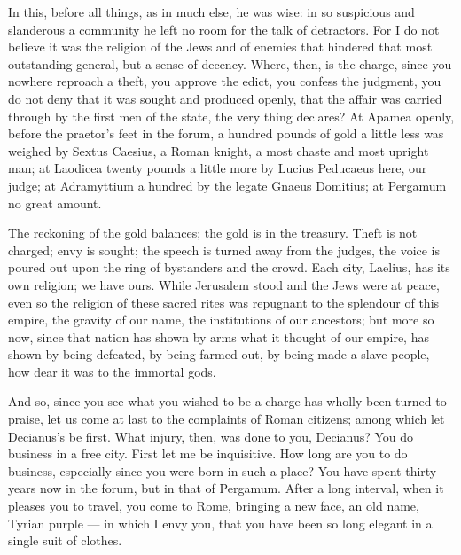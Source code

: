  In this, before all things, as in much else, he was wise: in so suspicious and slanderous a community he left no room for the talk of detractors. For I do not believe it was the religion of the Jews and of enemies that hindered that most outstanding general, but a sense of decency. Where, then, is the charge, since you nowhere reproach a theft, you approve the edict, you confess the judgment, you do not deny that it was sought and produced openly, that the affair was carried through by the first men of the state, the very thing declares? At Apamea openly, before the praetor's feet in the forum, a hundred pounds of gold a little less was weighed by Sextus Caesius, a Roman knight, a most chaste and most upright man; at Laodicea twenty pounds a little more by Lucius Peducaeus here, our judge; at Adramyttium a hundred by the legate Gnaeus Domitius; at Pergamum no great amount.

 The reckoning of the gold balances; the gold is in the treasury. Theft is not charged; envy is sought; the speech is turned away from the judges, the voice is poured out upon the ring of bystanders and the crowd. Each city, Laelius, has its own religion; we have ours. While Jerusalem stood and the Jews were at peace, even so the religion of these sacred rites was repugnant to the splendour of this empire, the gravity of our name, the institutions of our ancestors; but more so now, since that nation has shown by arms what it thought of our empire, has shown by being defeated, by being farmed out, by being made a slave-people, how dear it was to the immortal gods.

 And so, since you see what you wished to be a charge has wholly been turned to praise, let us come at last to the complaints of Roman citizens; among which let Decianus's be first. What injury, then, was done to you, Decianus? You do business in a free city. First let me be inquisitive. How long are you to do business, especially since you were born in such a place? You have spent thirty years now in the forum, but in that of Pergamum. After a long interval, when it pleases you to travel, you come to Rome, bringing a new face, an old name, Tyrian purple --- in which I envy you, that you have been so long elegant in a single suit of clothes.

